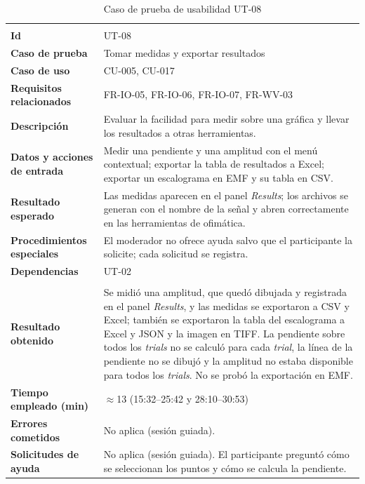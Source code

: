 \documentclass[12pt,letterpaper,oneside]{article}
\DeclareRobustCommand{\_}{\textunderscore\allowbreak}
\begin{document}
\begin{center}
\small
\begin{longtable}{|>{\raggedright\arraybackslash}p{}|>{\raggedright\arraybackslash}p{}|}
\hline
\endfirsthead
\hline
\endhead
\hline
\endfoot
\hline
\caption{Caso de prueba de usabilidad UT-08} \label{tab:ut-08} \\
\endlastfoot
\textbf{Id} & UT-08 \\
\hline
\textbf{Caso de prueba} & Tomar medidas y exportar resultados \\
\hline
\textbf{Caso de uso} & CU-005, CU-017 \\
\hline
\textbf{Requisitos relacionados} & FR-IO-05, FR-IO-06, FR-IO-07, FR-WV-03 \\
\hline
\textbf{Descripción} & Evaluar la facilidad para medir sobre una gráfica y llevar los resultados a otras herramientas. \\
\hline
\textbf{Datos y acciones de entrada} & Medir una pendiente y una amplitud con el menú contextual; exportar la tabla de resultados a Excel; exportar un escalograma en EMF y su tabla en CSV. \\
\hline
\textbf{Resultado esperado} & Las medidas aparecen en el panel \textit{Results}; los archivos se generan con el nombre de la señal y abren correctamente en las herramientas de ofimática. \\
\hline
\textbf{Procedimientos especiales} & El moderador no ofrece ayuda salvo que el participante la solicite; cada solicitud se registra. \\
\hline
\textbf{Dependencias} & UT-02 \\
\hline
\multicolumn{2}{|c|}{\textbf{Información para el seguimiento}} \\
\hline
\textbf{Resultado obtenido} & Se midió una amplitud, que quedó dibujada y registrada en el panel \textit{Results}, y las medidas se exportaron a CSV y Excel; también se exportaron la tabla del escalograma a Excel y JSON y la imagen en TIFF. La pendiente sobre todos los \textit{trials} no se calculó para cada \textit{trial}, la línea de la pendiente no se dibujó y la amplitud no estaba disponible para todos los \textit{trials}. No se probó la exportación en EMF. \\
\hline
\textbf{Tiempo empleado (min)} & $\approx$13 (15:32--25:42 y 28:10--30:53) \\
\hline
\textbf{Errores cometidos} & No aplica (sesión guiada). \\
\hline
\textbf{Solicitudes de ayuda} & No aplica (sesión guiada). El participante preguntó cómo se seleccionan los puntos y cómo se calcula la pendiente. \\

\end{longtable}
\end{center}
\end{document}
